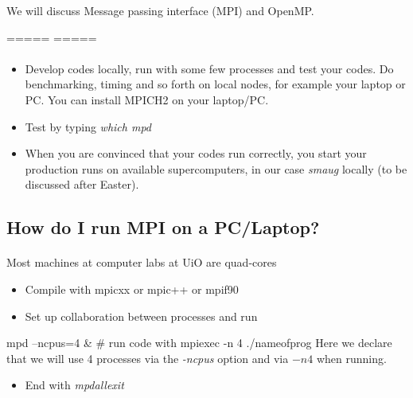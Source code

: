 \documentclass[%
twoside,                 %
final,                   %
10pt]{article}
\begin{document}
\noindent
We will discuss Message passing interface (MPI) and OpenMP.



=====  =====

\paragraph{}
\begin{itemize}
\item Develop codes locally, run with some few processes and test your codes.  Do benchmarking, timing and so forth on local nodes, for example your laptop or PC.  You can install MPICH2 on  your laptop/PC. 

\item Test by typing \emph{which mpd}

\item When you are convinced that your codes run correctly, you start your production runs on available supercomputers, in our case \emph{smaug} locally (to be discussed after Easter).
\end{itemize}

\noindent



\subsection{How do I run MPI on a PC/Laptop?}

\paragraph{}
Most machines at computer labs at UiO are quad-cores
\begin{itemize}
\item Compile with mpicxx or mpic++ or mpif90

\item Set up collaboration between processes and run 
\end{itemize}

\noindent
\bcppcod
mpd --ncpus=4 &
#  run code with
mpiexec -n 4 ./nameofprog
\ecppcod
Here we declare that we will use 4 processes via the \emph{-ncpus} option and via $-n 4$ when running.
\begin{itemize}
\item End with \emph{mpdallexit}
\end{itemize}
\end{document}
